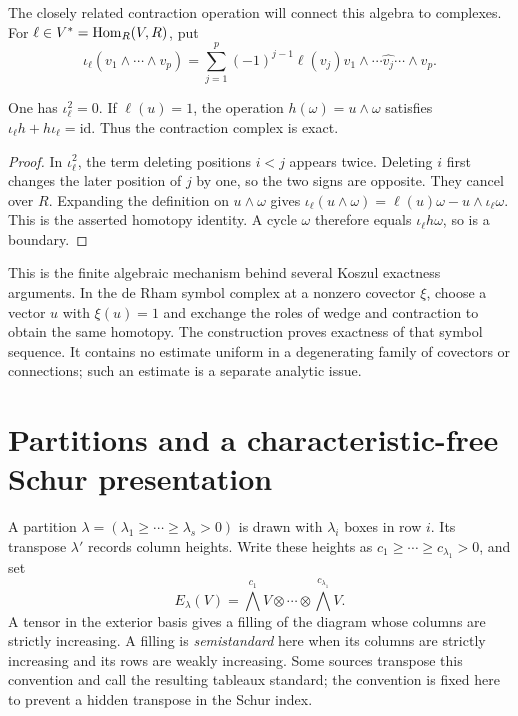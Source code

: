 The closely related contraction operation will connect this algebra
to complexes.  For \(\ell\in V^*=\operatorname{Hom}_R(V,R)\), put
\[
 \iota_\ell(v_1\wedge\cdots\wedge v_p)
  =\sum_{j=1}^p(-1)^{j-1}\ell(v_j)
       v_1\wedge\cdots\widehat{v_j}\cdots\wedge v_p.
\]

\begin{lemma}
One has \(\iota_\ell^2=0\).  If \(\ell(u)=1\), the operation
\(h(\omega)=u\wedge\omega\) satisfies
\(\iota_\ell h+h\iota_\ell=\mathrm{id}\).  Thus the contraction
complex is exact.
\end{lemma}
\begin{proof}
In \(\iota_\ell^2\), the term deleting positions \(i<j\) appears
twice.  Deleting \(i\) first changes the later position of \(j\)
by one, so the two signs are opposite.  They cancel over \(R\).
Expanding the definition on \(u\wedge\omega\) gives
\(\iota_\ell(u\wedge\omega)=\ell(u)\omega-u\wedge\iota_\ell\omega\).
This is the asserted homotopy identity.  A cycle \(\omega\)
therefore equals \(\iota_\ell h\omega\), so is a boundary.
\end{proof}

This is the finite algebraic mechanism behind several Koszul
exactness arguments.  In the de Rham symbol complex at a nonzero
covector \(\xi\), choose a vector \(u\) with \(\xi(u)=1\) and exchange
the roles of wedge and contraction to obtain the same homotopy.
The construction proves exactness of that symbol sequence.  It
contains no estimate uniform in a degenerating family of covectors
or connections; such an estimate is a separate analytic issue.

\section{Partitions and a characteristic-free Schur presentation}

A partition \(\lambda=(\lambda_1\ge\cdots\ge\lambda_s>0)\) is
drawn with \(\lambda_i\) boxes in row \(i\).  Its transpose
\(\lambda'\) records column heights.  Write these heights as
\(c_1\ge\cdots\ge c_{\lambda_1}>0\), and set
\[
 E_\lambda(V)=
  \bigwedge^{c_1}V\otimes\cdots\otimes\bigwedge^{c_{\lambda_1}}V.
\]
A tensor in the exterior basis gives a filling of the diagram whose
columns are strictly increasing.  A filling is
\emph{semistandard} here when its columns are strictly increasing
and its rows are weakly increasing.  Some sources transpose this
convention and call the resulting tableaux standard; the convention
is fixed here to prevent a hidden transpose in the Schur index.

